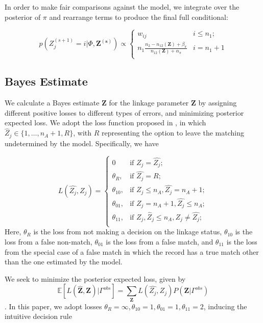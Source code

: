 \documentclass[12pt,letterpaper]{article}
\newcommand{\1}[1]{\mathbb{I}\!\left[#1\right]} %
\begin{document}
In order to make fair comparisons against the \citep{sadinle_bayesian_2017} model, we
integrate over the posterior of \(\pi\) and rearrange terms to
produce the final full conditional:

\[p\left(Z_j^{(s+1)}  = i| \Phi, \bm{Z^{(s)}}\right) \propto
\begin{cases} 
	w_{ij}  & i \leq n_1; \\
	n_1 \frac{n_2 - n_{12}(\bm{Z}) + \beta_{\pi}}{n_{12}(\bm{Z}) + \alpha_{\pi}} & i  = n_1 + 1 \\
\end{cases}\]

\hypertarget{bayes-estimate}{%
	\subsection{Bayes Estimate}
	\label{bayes-estimate}}

We calculate a Bayes estimate \(\hat{\bm{Z}}\) for the linkage
parameter \(\bm{Z}\) by assigning different positive losses to
different types of errors, and minimizing posterior expected loss. We
adopt the loss function proposed in \cite{sadinle_bayesian_2017}, in which
\(\hat{Z}_j \in \{1, \ldots, n_A + 1, R\}\), with \(R\) representing the
option to leave the matching undetermined by the model. Specifically, we have

\[L(\hat{Z_j}, Z_j)=\begin{cases} 
	0  & \text{if } Z_j = \hat{Z_j}; \\
	\theta_R,  & \text{if } \hat{Z_j} = R; \\
	\theta_{10},  & \text{if } Z_j \leq n_A,\hat{Z_j} = n_A + 1 ; \\
	\theta_{01},  & \text{if } Z_j = n_A + 1,\hat{Z_j} \leq n_A ; \\
	\theta_{11},  & \text{if } Z_j, \hat{Z}_j \leq n_A, Z_j \neq \hat{Z_j} ; \\
\end{cases}\] Here, \(\theta_R\) is the loss from not making a decision
on the linkage status, \(\theta_{10}\) is the loss from a false
non-match, \(\theta_{01}\) is the loss from a false match, and
\(\theta_{11}\) is the loss from the special case of a false match in
which the record has a true match other than the one estimated by the
model. 

We seek to minimize the posterior expected loss, given by 
$$\mathbb{E}[L(\hat{\bm{Z}}, \bm{Z})|\Gamma^{obs}] = \sum_{\bm{Z}} L(\hat{Z_j}, Z_j)P(\bm{Z}|\Gamma^{obs})$$. 
In this paper, we adopt losses $\theta_R = \infty, \theta_{10} = 1, \theta_{01} = 1, \theta_{11} = 2$, inducing the intuitive decision rule
\end{document}
